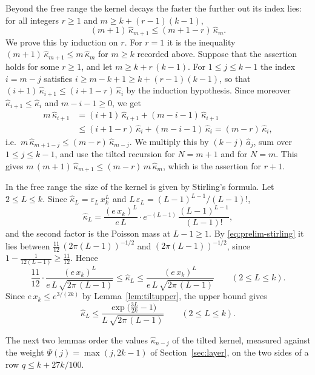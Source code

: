 \documentclass{amsart}
\theoremstyle{definition}
\theoremstyle{remark}
\numberwithin{equation}{section}
\begin{document}
Beyond the free range the kernel decays the faster the further out its index lies: for all integers $r\ge 1$ and $m\ge k+(r-1)(k-1)$,
\begin{equation}\label{eq:left-rate}
(m+1)\,\hat\kappa_{m+1}\le(m+1-r)\,\hat\kappa_m .
\end{equation}
We prove this by induction on $r$. For $r=1$ it is the inequality $(m+1)\,\hat\kappa_{m+1}\le m\,\hat\kappa_m$ for $m\ge k$ recorded above. Suppose that the assertion holds for some $r\ge 1$, and let $m\ge k+r\,(k-1)$. For $1\le j\le k-1$ the index $i=m-j$ satisfies $i\ge m-k+1\ge k+(r-1)(k-1)$, so that $(i+1)\,\hat\kappa_{i+1}\le(i+1-r)\,\hat\kappa_i$ by the induction hypothesis. Since moreover $\hat\kappa_{i+1}\le\hat\kappa_i$ and $m-i-1\ge 0$, we get
\begin{align*}
m\,\hat\kappa_{i+1}&=(i+1)\,\hat\kappa_{i+1}+(m-i-1)\,\hat\kappa_{i+1}\\
&\le(i+1-r)\,\hat\kappa_i+(m-i-1)\,\hat\kappa_i=(m-r)\,\hat\kappa_i ,
\end{align*}
i.e.\ $m\,\hat\kappa_{m+1-j}\le(m-r)\,\hat\kappa_{m-j}$. We multiply this by $(k-j)\,\hat a_j$, sum over $1\le j\le k-1$, and use the tilted recursion for $N=m+1$ and for $N=m$. This gives $m\,(m+1)\,\hat\kappa_{m+1}\le(m-r)\,m\,\hat\kappa_m$, which is the assertion for $r+1$.

In the free range the size of the kernel is given by Stirling's formula. Let $2\le L\le k$. Since $\hat\kappa_L=\varepsilon_L\,x_k^{L}$ and $L\,\varepsilon_L=(L-1)^{L-1}/(L-1)!$,
\[
\hat\kappa_L=\frac{(e\,x_k)^{L}}{e\,L}\cdot e^{-(L-1)}\,\frac{(L-1)^{L-1}}{(L-1)!},
\]
and the second factor is the Poisson mass at $L-1\ge 1$. By \eqref{eq:prelim-stirling} it lies between $\frac{11}{12}\,(2\pi(L-1))^{-1/2}$ and $(2\pi(L-1))^{-1/2}$, since $1-\frac{1}{12(L-1)}\ge\frac{11}{12}$. Hence
\begin{equation}\label{eq:left-free}
\frac{11}{12}\cdot\frac{(e\,x_k)^{L}}{e\,L\,\sqrt{2\pi\,(L-1)}}\le\hat\kappa_L\le\frac{(e\,x_k)^{L}}{e\,L\,\sqrt{2\pi\,(L-1)}}\qquad(2\le L\le k).
\end{equation}
Since $e\,x_k\le e^{3/(2k)}$ by Lemma~\ref{lem:tiltupper}, the upper bound gives
\begin{equation}\label{eq:left-freeupper}
\hat\kappa_L\le\frac{\exp\bigl(\frac{3L}{2k}-1\bigr)}{L\,\sqrt{2\pi\,(L-1)}}\qquad(2\le L\le k).
\end{equation}

The next two lemmas order the values $\hat\kappa_{n-j}$ of the tilted kernel, measured against the weight $\Psi(j)=\max(j,2k-1)$ of Section~\ref{sec:layer}, on the two sides of a row $q\le k+27k/100$.
\end{document}
